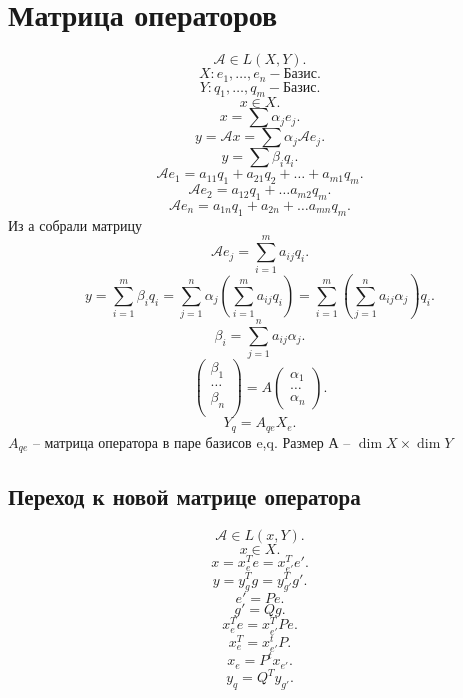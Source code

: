 \documentclass{scrartcl}
\begin{document}
\section{Матрица операторов}
\[
    \mathcal{A} \in L(X,Y)
.\] 
\[
    X : e_1,\dots,e_n - \text{Базис}
.\] 
\[
    Y: q_1,\dots,q_{m} - \text{Базис}
.\] 
\[
x \in X
.\] 
\[
x = \sum \alpha_{j} e_{j}
.\] 
\[
    y = \mathcal{A} x = \sum \alpha_{j} \mathcal{A} e_{j}
.\] 
\[
 y = \sum  \beta_{i} q_{i}
.\]
\[
    \mathcal{A} e_1 = a_{11} q_1 + a_{21} q_2 + \dots + a_{m1} q_{m}
.\] 
\[
    \mathcal{A} e_2 = a_{12} q_1 + \dots a_{m 2} q_{m}
.\] 
\[
    \mathcal{A} e_{n} = a_{1 n} q_1 + a_{2 n} + \dots a_{mn} q_{m}
.\] 
Из а собрали матрицу
\[
    \mathcal{A} e_{j} = \sum_{i = 1}^{m} a_{ij} q_{i}
.\] 
\[
y = \sum_{i = 1}^{m} \beta_{i}q_{i} = \sum_{j = 1}^{n} \alpha_{j} ( \sum_{i = 1}^{m} a_{ij} q_{i} ) =
\sum_{i = 1}^{m} ( \sum_{j = 1}^{n} a_{ij} \alpha_{j} ) q_{i}
.\] 
\[
    \beta_{i} = \sum_{j = 1} ^{n} a_{ij} \alpha_{j}
.\] 
\[
\begin{pmatrix} 
\beta_1\\
\dots\\
\beta_{n}\\
\end{pmatrix}  =
A
\begin{pmatrix} 
\alpha_1\\
\dots\\
\alpha_{n}
\end{pmatrix} 
.\] 
\[
Y_{q} = A_{qe}X_{e}
.\] 
$A_{qe}$ -- матрица оператора в паре базисов e,q.
Размер А -- $\dim{X} \times \dim{Y}$
\subsection{Переход к новой матрице оператора}
\[
    \mathcal{A} \in L(x,Y)
.\] 
\[
x \in X
.\] 
\[
    x = x_{e}^{T} e = x^{T}_{e'}e'
.\] 
\[
y = y^{T}_{g}g = y^{T}_{g'}g'
.\] 
\[
    e' = Pe
.\] 
\[
g'  = Qg
.\] 
\[
x_{e}^{T} e = x_{e'}^{T} Pe
.\] 
\[
x_{e}^{T} = x_{e'}^{t}P
.\] 
\[
x_{e} =  P^{t} x_{e'}
.\] 
\[
y_{q} = Q^{T} y_{g'}
.\] 
\end{document}
